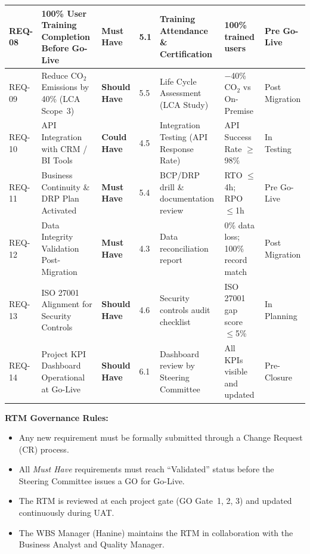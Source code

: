 \begin{table}[H]
\begin{tabular}{|p{1.1cm}|p{3.2cm}|p{1.8cm}|p{0.9cm}|p{2.8cm}|p{2.6cm}|p{1.2cm}|}
REQ-08 & 100\% User Training Completion Before Go-Live &
\cellcolor{musthavebg}\textbf{\textcolor{musthave}{Must Have}} &
5.1 & Training Attendance \& Certification & 100\% trained users & Pre Go-Live \\
\hline

REQ-09 & Reduce CO$_2$ Emissions by 40\% (LCA Scope~3) &
\cellcolor{shouldhavebg}\textbf{\textcolor{shouldhave}{Should Have}} &
5.5 & Life Cycle Assessment (LCA Study) & $-$40\% CO$_2$ vs On-Premise & Post Migration \\
\hline

REQ-10 & API Integration with CRM / BI Tools &
\cellcolor{couldhavebg}\textbf{\textcolor{couldhave}{Could Have}} &
4.5 & Integration Testing (API Response Rate) & API Success Rate $\geq$98\% & In Testing \\
\hline

REQ-11 & Business Continuity \& DRP Plan Activated &
\cellcolor{musthavebg}\textbf{\textcolor{musthave}{Must Have}} &
5.4 & BCP/DRP drill \& documentation review & RTO $\leq$4h; RPO $\leq$1h & Pre Go-Live \\
\hline

REQ-12 & Data Integrity Validation Post-Migration &
\cellcolor{musthavebg}\textbf{\textcolor{musthave}{Must Have}} &
4.3 & Data reconciliation report & 0\% data loss; 100\% record match & Post Migration \\
\hline

REQ-13 & ISO 27001 Alignment for Security Controls &
\cellcolor{shouldhavebg}\textbf{\textcolor{shouldhave}{Should Have}} &
4.6 & Security controls audit checklist & ISO 27001 gap score $\leq$5\% & In Planning \\
\hline

REQ-14 & Project KPI Dashboard Operational at Go-Live &
\cellcolor{shouldhavebg}\textbf{\textcolor{shouldhave}{Should Have}} &
6.1 & Dashboard review by Steering Committee & All KPIs visible and updated & Pre-Closure \\
\hline

\end{tabular}
\end{table}

\medskip
\noindent\textbf{RTM Governance Rules:}
\begin{itemize}
    \item Any new requirement must be formally submitted through a Change Request (CR) process.
    \item All \textit{Must Have} requirements must reach ``Validated'' status before the Steering Committee issues a GO for Go-Live.
    \item The RTM is reviewed at each project gate (GO Gate~1, 2, 3) and updated continuously during UAT.
    \item The WBS Manager (Hanine) maintains the RTM in collaboration with the Business Analyst and Quality Manager.
\end{itemize}

\medskip


\vspace{12pt}